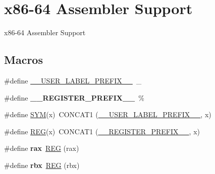 \hypertarget{group__RTEMSScoreCPUx86-64ASM}{}\section{x86-\/64 Assembler Support}
\label{group__RTEMSScoreCPUx86-64ASM}


x86-\/64 Assembler Support  


\subsection*{Macros}
\begin{DoxyCompactItemize}
\item 
\#define \mbox{\hyperlink{group__RTEMSScoreCPUx86-64ASM_gaff6bf0ff0fa3b5cbd23a8ae1131c87a9}{\+\_\+\+\_\+\+U\+S\+E\+R\+\_\+\+L\+A\+B\+E\+L\+\_\+\+P\+R\+E\+F\+I\+X\+\_\+\+\_\+}}~\+\_\+
\item 
\mbox{\label{group__RTEMSScoreCPUx86-64ASM_ga08d4062230ffc8494f4be4f6447497e4}} 
\#define {\bfseries \+\_\+\+\_\+\+R\+E\+G\+I\+S\+T\+E\+R\+\_\+\+P\+R\+E\+F\+I\+X\+\_\+\+\_\+}~\%
\item 
\#define \mbox{\hyperlink{group__RTEMSScoreCPUx86-64ASM_gafe05d428a5f345f51fb591debb815325}{S\+YM}}(x)~C\+O\+N\+C\+A\+T1 (\mbox{\hyperlink{group__RTEMSScoreCPUx86-64ASM_gaff6bf0ff0fa3b5cbd23a8ae1131c87a9}{\+\_\+\+\_\+\+U\+S\+E\+R\+\_\+\+L\+A\+B\+E\+L\+\_\+\+P\+R\+E\+F\+I\+X\+\_\+\+\_\+}}, x)
\item 
\#define \mbox{\hyperlink{group__RTEMSScoreCPUx86-64ASM_gacee196421e9a06f7700bb3064b13b37a}{R\+EG}}(x)~C\+O\+N\+C\+A\+T1 (\mbox{\hyperlink{group__RTEMSScoreCPUV850ASM_ga08d4062230ffc8494f4be4f6447497e4}{\+\_\+\+\_\+\+R\+E\+G\+I\+S\+T\+E\+R\+\_\+\+P\+R\+E\+F\+I\+X\+\_\+\+\_\+}}, x)
\item 
\mbox{\label{group__RTEMSScoreCPUx86-64ASM_ga1bf55b988238bef53dcf49ef2d043425}} 
\#define {\bfseries rax}~\mbox{\hyperlink{group__RTEMSScoreCPUx86-64ASM_gacee196421e9a06f7700bb3064b13b37a}{R\+EG}} (rax)
\item 
\mbox{\label{group__RTEMSScoreCPUx86-64ASM_gacfcdbd2e772fff1a2fad36a888423d12}} 
\#define {\bfseries rbx}~\mbox{\hyperlink{group__RTEMSScoreCPUx86-64ASM_gacee196421e9a06f7700bb3064b13b37a}{R\+EG}} (rbx)
\item 

\end{DoxyCompactItemize}
